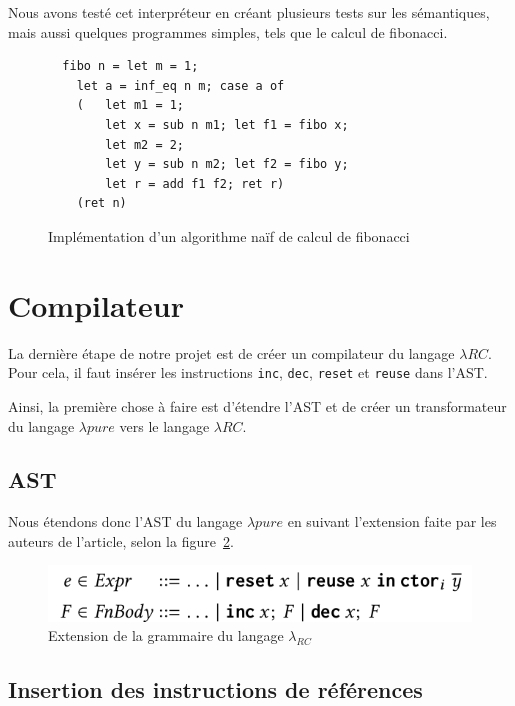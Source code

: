 \documentclass{rapportECL}
\begin{document}
\bigskip

Nous avons testé cet interpréteur en créant plusieurs tests sur les sémantiques, mais aussi quelques programmes simples, 
tels que le calcul de fibonacci.

\begin{figure}[H]
	\begin{lstlisting}
  fibo n = let m = 1;
    let a = inf_eq n m; case a of
    (   let m1 = 1;
        let x = sub n m1; let f1 = fibo x;
        let m2 = 2;
        let y = sub n m2; let f2 = fibo y;
        let r = add f1 f2; ret r)
    (ret n)
	\end{lstlisting}
	\caption{Implémentation d'un algorithme naïf de calcul de fibonacci}
	\label{listing:fibo_naif}
\end{figure}
\FloatBarrier 

\section{Compilateur}

La dernière étape de notre projet est de créer un compilateur du langage $\lambda{RC}$. Pour cela, il faut insérer les 
instructions \verb|inc|, \verb|dec|, \verb|reset| et \verb|reuse| dans l'AST. 

Ainsi, la première chose à faire est
d'étendre l'AST et de créer un transformateur du langage $\lambda{pure}$ vers le langage $\lambda{RC}$.

\subsection{AST}

Nous étendons donc l'AST du langage $\lambda{pure}$ en suivant l'extension faite par les auteurs de l'article\cite{ullrich_counting_2020},
selon la figure~\ref{fig:grammaire RC}.

\begin{figure}[hbt!]
	\centering
	\includegraphics[scale=0.45]{logos/grammaire_RC.png}
	\caption{Extension de la grammaire du langage $\lambda_{RC}$}
	\label{fig:grammaire RC}
\end{figure}
\FloatBarrier 

\subsection{Insertion des instructions de références} \label{section:insert_inc_dec}
\end{document}
